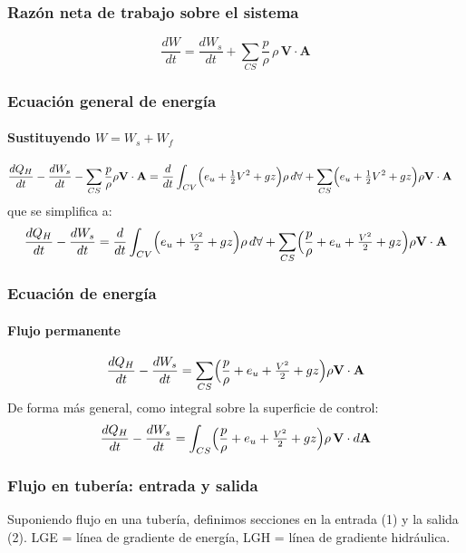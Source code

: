 \documentclass{ltx-talk}
\begin{document}
\begin{frame}
  \frametitle{Razón neta de trabajo sobre el sistema}
  \[
    \frac{dW}{dt} = \frac{dW_s}{dt} + \sum_{CS} \frac{p}{\rho}\,\rho\,\mathbf{V}\cdot\mathbf{A}
  \]
\end{frame}

\begin{frame}
  \frametitle{Ecuación general de energía}
  \framesubtitle{Sustituyendo $W = W_s + W_f$}
  \begin{align*}
    \frac{dQ_H}{dt} - \frac{dW_s}{dt} - \sum_{CS}\frac{p}{\rho}\rho\mathbf{V}\cdot\mathbf{A}
      &= \frac{d}{dt}\int_{CV}\Bigl(e_u+\tfrac{1}{2}V^2+gz\Bigr)\rho\,d\forall
         + \sum_{CS}\Bigl(e_u+\tfrac{1}{2}V^2+gz\Bigr)\rho\mathbf{V}\cdot\mathbf{A}
  \end{align*}
  que se simplifica a:
  \[
    \frac{dQ_H}{dt} - \frac{dW_s}{dt}
      = \frac{d}{dt}\int_{CV}\Bigl(e_u+\tfrac{V^2}{2}+gz\Bigr)\rho\,d\forall
        + \sum_{CS}\Bigl(\frac{p}{\rho}+e_u+\tfrac{V^2}{2}+gz\Bigr)\rho\mathbf{V}\cdot\mathbf{A}
  \]
\end{frame}

\begin{frame}
  \frametitle{Ecuación de energía}
  \framesubtitle{Flujo permanente}
  \[
    \frac{dQ_H}{dt} - \frac{dW_s}{dt}
      = \sum_{CS}\Bigl(\frac{p}{\rho}+e_u+\tfrac{V^2}{2}+gz\Bigr)\rho\mathbf{V}\cdot\mathbf{A}
  \]
  De forma más general, como integral sobre la superficie de control:
  \[
    \frac{dQ_H}{dt} - \frac{dW_s}{dt}
      = \int_{CS}\Bigl(\frac{p}{\rho}+e_u+\tfrac{V^2}{2}+gz\Bigr)\rho\,\mathbf{V}\cdot d\mathbf{A}
  \]
\end{frame}

\begin{frame}
  \frametitle{Flujo en tubería: entrada y salida}
  \begin{center}
  \end{center}
  Suponiendo flujo en una tubería, definimos secciones en la entrada
  (1) y la salida (2). LGE = línea de gradiente de energía, LGH = línea
  de gradiente hidráulica.
\end{frame}
\end{document}
